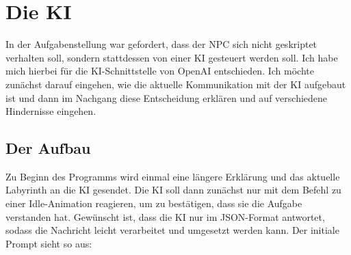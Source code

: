 \documentclass[a4paper]{article}
\begin{document}
\section{Die KI}
In der Aufgabenstellung war gefordert, dass der NPC sich nicht geskriptet verhalten soll, sondern stattdessen von einer KI gesteuert werden soll. Ich habe mich hierbei für die KI-Schnittstelle von OpenAI entschieden. Ich möchte zunächst darauf eingehen, wie die aktuelle Kommunikation mit der KI aufgebaut ist und dann im Nachgang diese Entscheidung erklären und auf verschiedene Hindernisse eingehen.

\subsection{Der Aufbau}
Zu Beginn des Programms wird einmal eine längere Erklärung und das aktuelle Labyrinth an die KI gesendet. Die KI soll dann zunächst nur mit dem Befehl zu einer Idle-Animation reagieren, um zu bestätigen, dass sie die Aufgabe verstanden hat. Gewünscht ist, dass die KI nur im JSON-Format antwortet, sodass die Nachricht leicht verarbeitet und umgesetzt werden kann. Der initiale Prompt sieht so aus:
\end{document}
